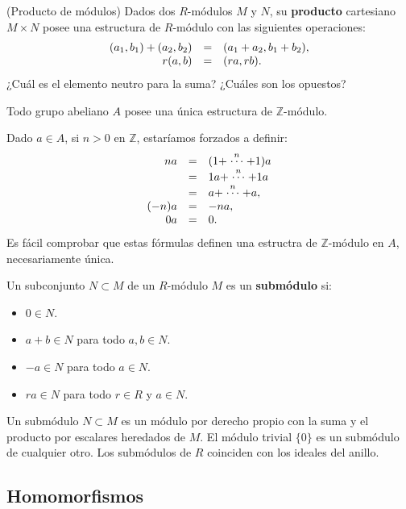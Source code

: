 \textrm{\normalfont (Producto de módulos)} Dados dos
\(R\)-módulos \(M\) y \(N\), su \textbf{producto} cartesiano
\(M\times N\) posee una estructura de \(R\)-módulo con las siguientes
operaciones:
\[\begin{array}{rcl}(a_1,b_1)+(a_2,b_2)&=&(a_1+a_2,b_1+b_2),\cr r(a,b)&=&(ra,rb).\end{array}\]
¿Cuál es el elemento neutro para la suma? ¿Cuáles son los opuestos?


Todo grupo abeliano \(A\) posee una única estructura de
\(\mathbb Z\)-módulo. 


Dado \(a\in A\), si \(n>0\) en \(\mathbb Z\), estaríamos forzados a
definir: \[\begin{array}{rcl}
n a&=&(1+\stackrel{n}{\cdots}+1)a\cr&=&1a+\stackrel{n}{\cdots}+1a\cr&=&a+\stackrel{n}{\cdots}+a,\cr
(-n)a&=&-na,\cr
0a&=&0.
\end{array}\] Es fácil comprobar que estas fórmulas definen una
estructra de \(\mathbb Z\)-módulo en \(A\), necesariamente única.\\


Un subconjunto \(N\subset M\) de un \(R\)-módulo \(M\) es un
\textbf{submódulo} si:

\begin{itemize}
\item
  \(0\in N\).
\item
  \(a+b\in N\) para todo \(a,b\in N\).
\item
  \(-a\in N\) para todo \(a\in N\).
\item
  \(ra\in N\) para todo \(r\in R\) y \(a\in N\).
\end{itemize}



Un submódulo \(N\subset M\) es un módulo por derecho propio con la suma
y el producto por escalares heredados de \(M\). El módulo trivial
\(\{0\}\) es un submódulo de cualquier otro. Los submódulos de \(R\)
coinciden con los ideales del anillo. 

\hypertarget{homomorfismos}{%
\subsection{Homomorfismos}\label{homomorfismos}}

